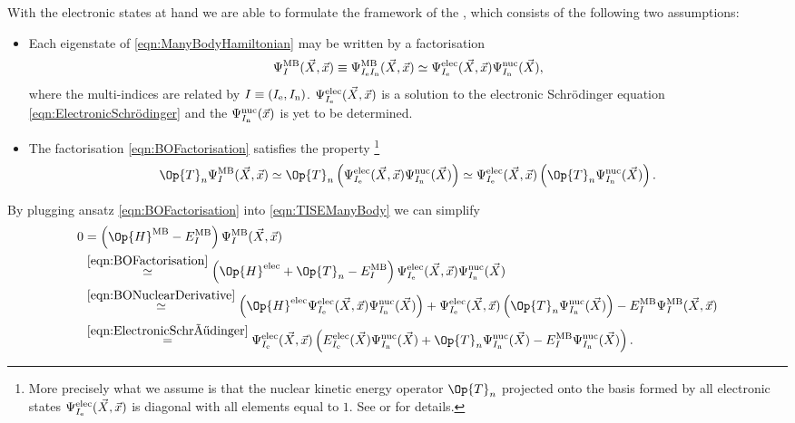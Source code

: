With the electronic states at hand we are able to formulate
the framework of the ,
which consists of the following two assumptions:
\begin{itemize}
	\item Each eigenstate of \eqref{eqn:ManyBodyHamiltonian} may be written
		by a factorisation
	\begin{equation}
		\Psi^\text{MB}_I(\vec{X}, \vec{x}) \equiv \Psi^\text{MB}_{I_\text{e}I_\text{n}}(\vec{X}, \vec{x})
		\simeq \Psi^\text{elec}_{I_\text{e}}(\vec{X}, \vec{x})
		\Psi^\text{nuc}_{I_\text{n}}(\vec{X}),
		\label{eqn:BOFactorisation}
	\end{equation}
	where the multi-indices are related by $I \equiv (I_\text{e}, I_\text{n})$.
	$\Psi^\text{elec}_{I_\text{e}}(\vec{X}, \vec{x})$ is a solution
	to the electronic Schrödinger equation \eqref{eqn:ElectronicSchrödinger}
	and the 
	$\Psi^\text{nuc}_{I_\text{n}}(\vec{x})$ is yet to be determined.
	\item The factorisation \eqref{eqn:BOFactorisation} satisfies the property%
	\footnote{%
		More precisely what we assume is that the nuclear kinetic energy
		operator $\Op{T}_n$ projected onto the basis formed by
		all electronic states $\Psi^\text{elec}_{I_\text{e}}(\vec{X}, \vec{x})$
		is diagonal with all elements equal to $1$.
		See \cite{Baer2006} or \cite{WikipediaBornOppenheimer} for details.
	}
	\begin{equation}
		\Op{T}_n \Psi^\text{MB}_{I}(\vec{X}, \vec{x})
		\simeq \Op{T}_n \left( \Psi^\text{elec}_{\Iel}(\vec{X}, \vec{x})
		\Psi^\text{nuc}_{\Inu}(\vec{X}) \right)
		\simeq \Psi^\text{elec}_{\Iel}(\vec{X}, \vec{x})
		\left(\Op{T}_n \Psi^\text{nuc}_{\Inu}(\vec{X}) \right).
		\label{eqn:BONuclearDerivative}
	\end{equation}
\end{itemize}
By plugging ansatz \eqref{eqn:BOFactorisation} into \eqref{eqn:TISEManyBody}
we can simplify
\begin{align*}
	0 &=
	\left( \Op{H}^\text{MB} - E^\text{MB}_{I} \right)
	\Psi^\text{MB}_{I}(\vec{X}, \vec{x}) \\
	&\stackrel{\eqref{eqn:BOFactorisation}}{\simeq}
	\left( \Op{H}^\text{elec} + \Op{T}_n - E^\text{MB}_I \right)
	\Psi^\text{elec}_{\Iel}(\vec{X}, \vec{x}) \Psi^\text{nuc}_{\Inu}(\vec{X}) \\
	&\stackrel{\eqref{eqn:BONuclearDerivative}}{\simeq}
	\left( \Op{H}^\text{elec} \Psi^\text{elec}_{\Iel}(\vec{X}, \vec{x}) \Psi^\text{nuc}_{\Inu}(\vec{X}) \right)
	+ \Psi^\text{elec}_{\Iel}(\vec{X}, \vec{x}) \left(\Op{T}_n \Psi^\text{nuc}_{\Inu}(\vec{X}) \right)
	- E^\text{MB}_{I} \Psi^\text{MB}_I(\vec{X}, \vec{x})
	\\
	&\stackrel{\eqref{eqn:ElectronicSchrödinger}}{=}
	\Psi^\text{elec}_{\Iel}(\vec{X}, \vec{x})
	\left(E^\text{elec}_{\Iel}(\vec{X}) \Psi^\text{nuc}_{\Inu}(\vec{X})
	+ \Op{T}_n \Psi^\text{nuc}_{\Inu}(\vec{X})
	- E^\text{MB}_I \Psi^\text{nuc}_{\Inu}(\vec{X}) \right).
\end{align*}
